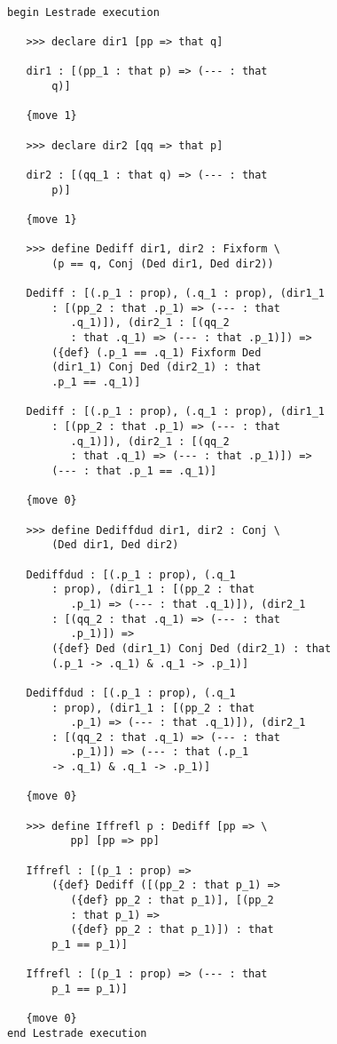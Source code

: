 \documentclass[12pt]{article}
\begin{document}
\begin{verbatim}

begin Lestrade execution

   >>> declare dir1 [pp => that q]

   dir1 : [(pp_1 : that p) => (--- : that 
       q)]

   {move 1}

   >>> declare dir2 [qq => that p]

   dir2 : [(qq_1 : that q) => (--- : that 
       p)]

   {move 1}

   >>> define Dediff dir1, dir2 : Fixform \
       (p == q, Conj (Ded dir1, Ded dir2))

   Dediff : [(.p_1 : prop), (.q_1 : prop), (dir1_1 
       : [(pp_2 : that .p_1) => (--- : that 
          .q_1)]), (dir2_1 : [(qq_2 
          : that .q_1) => (--- : that .p_1)]) => 
       ({def} (.p_1 == .q_1) Fixform Ded 
       (dir1_1) Conj Ded (dir2_1) : that 
       .p_1 == .q_1)]

   Dediff : [(.p_1 : prop), (.q_1 : prop), (dir1_1 
       : [(pp_2 : that .p_1) => (--- : that 
          .q_1)]), (dir2_1 : [(qq_2 
          : that .q_1) => (--- : that .p_1)]) => 
       (--- : that .p_1 == .q_1)]

   {move 0}

   >>> define Dediffdud dir1, dir2 : Conj \
       (Ded dir1, Ded dir2)

   Dediffdud : [(.p_1 : prop), (.q_1 
       : prop), (dir1_1 : [(pp_2 : that 
          .p_1) => (--- : that .q_1)]), (dir2_1 
       : [(qq_2 : that .q_1) => (--- : that 
          .p_1)]) => 
       ({def} Ded (dir1_1) Conj Ded (dir2_1) : that 
       (.p_1 -> .q_1) & .q_1 -> .p_1)]

   Dediffdud : [(.p_1 : prop), (.q_1 
       : prop), (dir1_1 : [(pp_2 : that 
          .p_1) => (--- : that .q_1)]), (dir2_1 
       : [(qq_2 : that .q_1) => (--- : that 
          .p_1)]) => (--- : that (.p_1 
       -> .q_1) & .q_1 -> .p_1)]

   {move 0}

   >>> define Iffrefl p : Dediff [pp => \
          pp] [pp => pp]

   Iffrefl : [(p_1 : prop) => 
       ({def} Dediff ([(pp_2 : that p_1) => 
          ({def} pp_2 : that p_1)], [(pp_2 
          : that p_1) => 
          ({def} pp_2 : that p_1)]) : that 
       p_1 == p_1)]

   Iffrefl : [(p_1 : prop) => (--- : that 
       p_1 == p_1)]

   {move 0}
end Lestrade execution
\end{verbatim}
\end{document}
